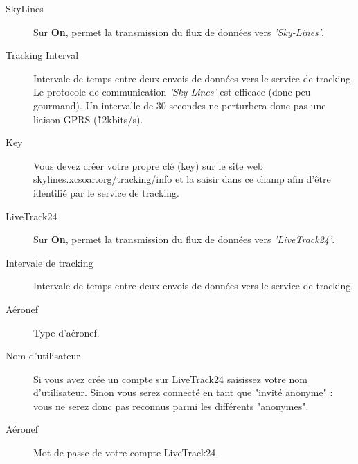 \begin{description}
\item[SkyLines] Sur {\bf On}, permet la transmission du flux de données vers {\it 'Sky-Lines'}.
\item[Tracking Interval] Intervale de temps entre deux envois de données vers le service de tracking. Le protocole de communication {\it 'Sky-Lines'} est efficace (donc peu gourmand). Un intervalle de 30 secondes ne perturbera donc pas une liaison GPRS (\~12kbits/s).
\item[Key] Vous devez créer votre propre clé (key)  sur le site web {\href{http://skylines.xcsoar.org/tracking/info}{skylines.xcsoar.org/tracking/info}} et la saisir dans ce champ afin d'être identifié par le service de tracking.
\item[LiveTrack24]Sur {\bf On}, permet la transmission du flux de données vers {\it 'LiveTrack24'}. 
\item[Intervale de tracking] Intervale de temps entre deux envois de données vers le service de tracking. 
\item[Aéronef] Type d'aéronef. 
\item[Nom d'utilisateur] Si vous avez crée un compte sur LiveTrack24 saisissez votre nom d'utilisateur. Sinon vous serez connecté en tant que "invité anonyme" : vous ne serez donc pas reconnus parmi les différents "anonymes".
\item[Aéronef] Mot de passe de votre compte LiveTrack24. 
\end{description}










